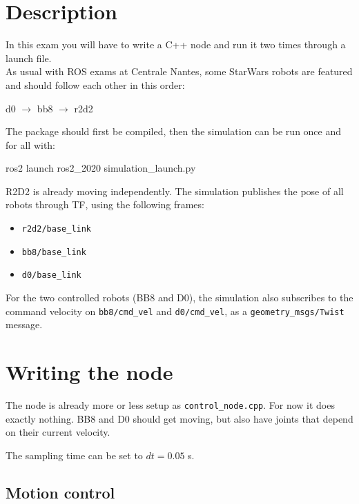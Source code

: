 \documentclass{ecnreport}
\begin{document}



\section{Description}

In this exam you will have to write a C++ node and run it two times through a launch file.\\
As usual with ROS exams at Centrale Nantes, some StarWars robots are featured and should follow each other in this order:
\begin{center}
 d0 $\rightarrow$ bb8 $\rightarrow$ r2d2
\end{center}

The package should first be compiled, then the simulation can be run once and for all with:
\begin{bashcodelarge}
 ros2 launch ros2_2020 simulation_launch.py
\end{bashcodelarge}


R2D2 is already moving independently. The simulation publishes the pose of all robots through TF, using the following frames:
\begin{itemize}
 \item \texttt{r2d2/base\_link}
 \item \texttt{bb8/base\_link}
 \item \texttt{d0/base\_link}
\end{itemize}

For the two controlled robots (BB8 and D0), the simulation also subscribes to the command velocity on \texttt{bb8/cmd\_vel} and \texttt{d0/cmd\_vel}, as a \texttt{geometry\_msgs/Twist} message.

\section{Writing the node}

The node is already more or less setup as \texttt{control\_node.cpp}. For now it does exactly nothing. BB8 and D0 should get moving, but also have joints that depend on their current velocity.

The sampling time can be set to $dt = 0.05$ s.

\subsection{Motion control}
\end{document}
